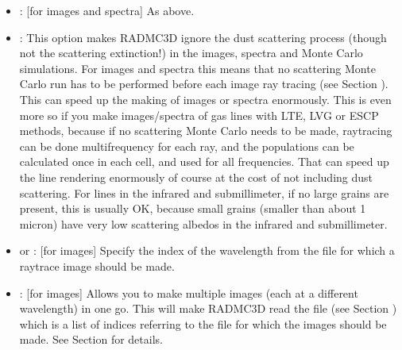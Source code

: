 \documentclass[letterpaper,10pt,english]{sphinxmanual}
\begin{document}
\begin{itemize}
\item {} 
: {[}for images and spectra{]} As
 above.

\item {} 
: This option makes RADMC\sphinxhyphen{}3D ignore the
dust scattering process (though not the scattering extinction!) in the
images, spectra and Monte Carlo simulations. For images and spectra this
means that no scattering Monte Carlo run has to be performed before each
image ray tracing (see Section {\hyperref[\detokenize{dustradtrans:sec-scat-monte-carlo}]{}}). This can speed
up the making of images or spectra enormously. This is even more so if you
make images/spectra of gas lines with LTE, LVG or ESCP methods, because if
no scattering Monte Carlo needs to be made, ray\sphinxhyphen{}tracing can be done
multi\sphinxhyphen{}frequency for each ray, and the populations can be calculated once
in each cell, and used for all frequencies. That can speed up the line
rendering enormously \textendash{} of course at the cost of not including dust
scattering. For lines in the infrared and submillimeter, if no large
grains are present, this is usually OK, because small grains (smaller than
about 1 micron) have very low scattering albedos in the infrared and
submillimeter.

\item {} 
 or : {[}for images{]} Specify the index of the wavelength
from the  file for which a ray\sphinxhyphen{}trace image should be
made.

\item {} 
: {[}for images{]} Allows you to make multiple
images (each at a different wavelength) in one go. This will make RADMC\sphinxhyphen{}3D
read the file  (see Section
{\hyperref[\detokenize{inputoutputfiles:sec-minor-input-files}]{}}) which is a list of indices 
referring to the  file for which the
images should be made. See Section {\hyperref[\detokenize{imagesspectra:sec-set-camera-frequencies}]{}} for
details.


\end{itemize}
\end{document}
